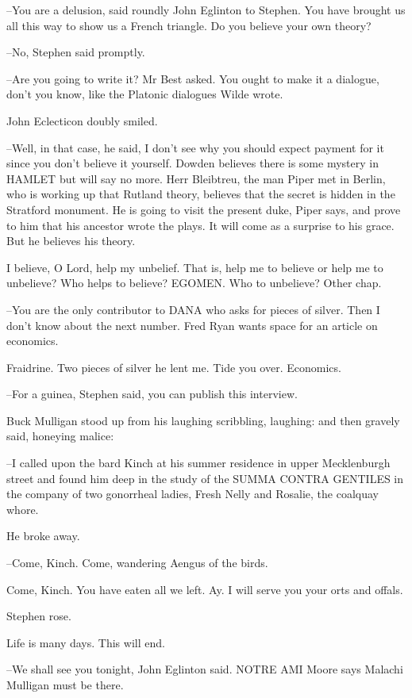 --You are a delusion, said roundly John Eglinton to Stephen. You have brought us all this way to show us a French triangle. Do you believe your own theory?

--No, Stephen said promptly.

--Are you going to write it? Mr Best asked. You ought to make it a dialogue, don't you know, like the Platonic dialogues Wilde wrote.

John Eclecticon doubly smiled.

--Well, in that case, he said, I don't see why you should expect payment for it since you don't believe it yourself. Dowden believes there is some mystery in HAMLET but will say no more. Herr Bleibtreu, the man Piper met in Berlin, who is working up that Rutland theory, believes that the secret is hidden in the Stratford monument. He is going to visit the present duke, Piper says, and prove to him that his ancestor wrote the plays. It will come as a surprise to his grace. But he believes his theory.

I believe, O Lord, help my unbelief. That is, help me to believe or help me to unbelieve? Who helps to believe? EGOMEN. Who to unbelieve? Other chap.

--You are the only contributor to DANA who asks for pieces of silver. Then I don't know about the next number. Fred Ryan wants space for an article on economics.

Fraidrine. Two pieces of silver he lent me. Tide you over. Economics.

--For a guinea, Stephen said, you can publish this interview.

Buck Mulligan stood up from his laughing scribbling, laughing: and then gravely said, honeying malice:

--I called upon the bard Kinch at his summer residence in upper Mecklenburgh street and found him deep in the study of the SUMMA CONTRA GENTILES in the company of two gonorrheal ladies, Fresh Nelly and Rosalie, the coalquay whore.

He broke away.

--Come, Kinch. Come, wandering Aengus of the birds.

Come, Kinch. You have eaten all we left. Ay. I will serve you your orts and offals.

Stephen rose.

Life is many days. This will end.

--We shall see you tonight, John Eglinton said. NOTRE AMI Moore says Malachi Mulligan must be there.


